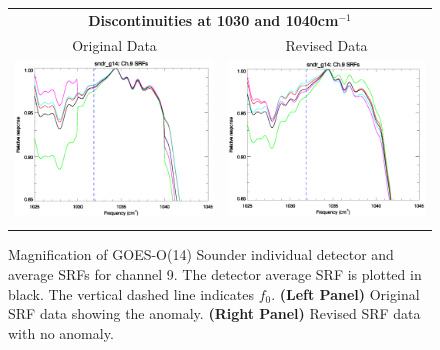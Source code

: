 \begin{figure}[htp]
  \centering
  \begin{tabular}{c c}
    \multicolumn{2}{c}{\textsf{\bfseries Discontinuities at 1030 and 1040cm$^{-1}$}} \\
    \hspace{1.5em}\textsf{Original Data} &
    \hspace{1.5em}\textsf{Revised Data} \\
    \includegraphics[scale=0.5,trim=0 40 0 0]{graphics/zoom_anomaly/original/sndr_g14.ch9.srf.eps} &
    \includegraphics[scale=0.5,trim=0 40 0 0]{graphics/zoom_anomaly/revised/sndr_g14.ch9.srf.eps} \\\\
  \end{tabular}
  \caption{Magnification of GOES-O(14) Sounder individual detector and average SRFs for channel 9. The detector average SRF is plotted in black. The vertical dashed line indicates $f_0$. \textbf{(Left Panel)} Original SRF data showing the anomaly. \textbf{(Right Panel)} Revised SRF data with no anomaly.}
  \label{fig:sndr_g14.ch9.anomaly}
\end{figure}

